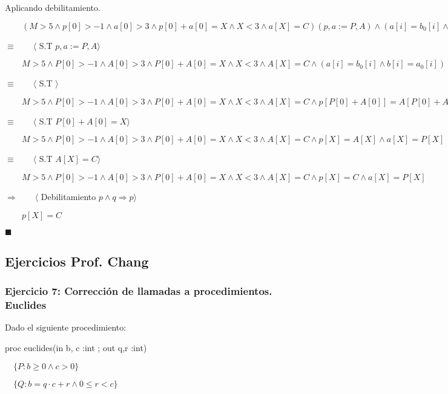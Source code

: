 \documentclass[hidelinks]{article}
\begin{document}
Aplicando debilitamiento.\par
$\qquad (M > 5 \land p[0] > -1 \land a[0] > 3 \land p[0] + a[0] = X \land X < 3 \land a[X] = C)(p,a := P,A) \land (a[i] = b_0[i] \land b[i] = a_0[i])(i,N,a_0,b_0,a,b := (p[0] + a[0])(p,a := P,A),M,P, A, p, a)$\par
$\equiv \qquad \langle$ S.T $p,a := P,A\rangle$\par
$\qquad M > 5 \land P[0] > -1 \land A[0] > 3 \land P[0] + A[0] = X \land X < 3 \land A[X] = C \land (a[i] = b_0[i] \land b[i] = a_0[i])(i,N,a_0,b_0,a,b := (p[0] + a[0])(p,a := P,A),M,P, A, p, a)$\par
$\equiv \qquad \langle$ S.T $\rangle$\par
$\qquad M > 5 \land P[0] > -1 \land A[0] > 3 \land P[0] + A[0] = X \land X < 3 \land A[X] = C \land p[P[0] + A[0]] = A[P[0] + A[0]] \land a[P[0] + A[0]] = P[P[0] + A[0]]$\par
$\equiv \qquad \langle$ S.T $P[0] + A[0] = X\rangle$\par
$\qquad M > 5 \land P[0] > -1 \land A[0] > 3 \land P[0] + A[0] = X \land X < 3 \land A[X] = C \land p[X] = A[X] \land a[X] = P[X]$\par
$\equiv \qquad \langle$ S.T $A[X] = C\rangle$\par
$\qquad M > 5 \land P[0] > -1 \land A[0] > 3 \land P[0] + A[0] = X \land X < 3 \land A[X] = C \land p[X] = C \land a[X] = P[X]$\par
$\Rightarrow \qquad \langle$ Debilitamiento $p \land q \Rightarrow p\rangle$\par
$\qquad p[X] = C $\par
$\blacksquare $\par

\newpage


\subsection{Ejercicios Prof. Chang}

\subsubsection{Ejercicio 7: Corrección de llamadas a procedimientos. Euclides}

Dado el siguiente procedimiento: \par

proc euclides(in b, c :int ; out q,r :int) \par
$\quad \{P: b \geq 0 \land c > 0\}$ \par
$\quad \{Q: b=q \cdot c + r \land 0 \leq r < c\}$ \par
\end{document}
